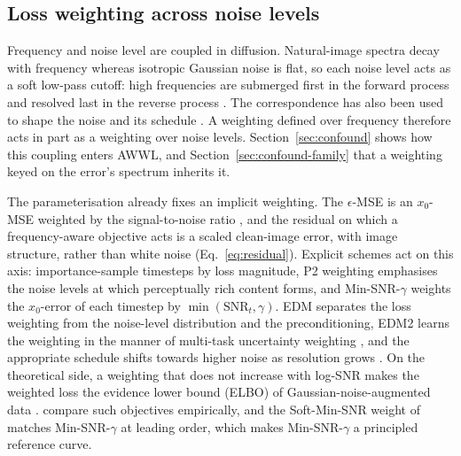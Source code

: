 \subsection{Loss weighting across noise levels}
\label{sec:related-timestep}

Frequency and noise level are coupled in diffusion. Natural-image spectra
decay with frequency whereas isotropic Gaussian noise is flat, so each noise
level acts as a soft low-pass cutoff: high frequencies are submerged first in
the forward process and resolved last in the reverse process
\citep{rissanen2023generative,hoogeboom2023blurring,dieleman2024spectral,falck2025fourier}.
The correspondence has also been used to shape the noise and its schedule
\citep{jiralerspong2025shaping,esteves2026spectrally}. A weighting defined
over frequency therefore acts in part as a weighting over noise levels.
Section~\ref{sec:confound} shows how this coupling enters AWWL, and
Section~\ref{sec:confound-family} that a weighting keyed on the error's
spectrum inherits it.

The parameterisation already fixes an implicit weighting. The $\epsilon$-MSE
is an $x_0$-MSE weighted by the signal-to-noise ratio
\citep{kingma2021variational,salimans2022progressive}, and the residual on
which a frequency-aware objective acts is a scaled clean-image error, with
image structure, rather than white noise (Eq.~\eqref{eq:residual}). Explicit
schemes act on this axis: \citet{nichol2021improved} importance-sample
timesteps by loss magnitude, P2 weighting \citep{choi2022perception}
emphasises the noise levels at which perceptually rich content forms, and
Min-SNR\nobreakdash-$\gamma$ \citep{hang2023efficient} weights the $x_0$-error of each
timestep by $\min(\mathrm{SNR}_t, \gamma)$. EDM \citep{karras2022elucidating}
separates the loss weighting from the noise-level distribution and the
preconditioning, EDM2 \citep{karras2024analyzing} learns the weighting in the
manner of multi-task uncertainty weighting \citep{kendall2018multi}, and the
appropriate schedule shifts towards higher noise as resolution grows
\citep{chen2023importance,hoogeboom2023simple}. On the theoretical side, a
weighting that does not increase with log-SNR makes the weighted loss the
evidence lower bound (ELBO) of Gaussian-noise-augmented data
\citep{kingma2023understanding}. \citet{kumar2025loss} compare such objectives
empirically, and the Soft-Min-SNR weight of \citet{li2026smoothed} matches
Min-SNR-$\gamma$ at leading order, which makes Min-SNR-$\gamma$ a principled
reference curve.

